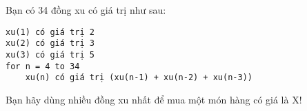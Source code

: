 Bạn có 34 đồng xu có giá trị như sau:  
\begin{verbatim}
xu(1) có giá trị 2
xu(2) có giá trị 3
xu(3) có giá trị 5
for n = 4 to 34
    xu(n) có giá trị (xu(n-1) + xu(n-2) + xu(n-3))
\end{verbatim}

   Bạn hãy dùng nhiều đồng xu nhất để mua một món hàng có giá là X!  

\